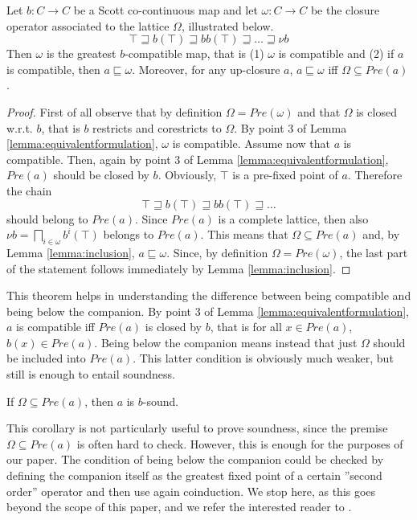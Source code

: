 \documentclass{llncs}
\begin{document}
\begin{theorem}
Let $b\colon C \to C$ be a Scott co-continuous map and let $\omega\colon C \to C$ be the closure operator associated to the lattice $\Omega$, illustrated below.
$$\top \sqsupseteq b(\top)\sqsupseteq bb(\top) \sqsupseteq \dots \sqsupseteq \nu b$$
Then $\omega$ is the greatest $b$-compatible map, that is (1) $\omega$ is compatible and (2) if $a$ is compatible, then $a\sqsubseteq \omega$.
Moreover, for any up-closure $a$, $a\sqsubseteq \omega$ iff $\Omega \subseteq Pre(a)$.
 \end{theorem}
\begin{proof}
First of all observe that by definition $\Omega= Pre(\omega)$ and that $\Omega$ is closed w.r.t. $b$, that is $b$ restricts and corestricts to $\Omega$. By point 3 of Lemma \ref{lemma:equivalentformulation}, $\omega$ is compatible.
Assume now that $a$ is compatible. Then, again by point 3 of Lemma \ref{lemma:equivalentformulation}, $Pre(a)$ should be closed by $b$. Obviously, $\top$ is a pre-fixed point of $a$. Therefore the chain $$\top \sqsupseteq b(\top)\sqsupseteq bb(\top) \sqsupseteq \dots $$ should belong to $Pre(a)$. Since $Pre(a)$ is a complete lattice, then also $\nu b =\bigsqcap_{i\in \omega} b^i(\top)$ belongs to $Pre(a)$. This means that $\Omega \subseteq Pre(a)$ and, by Lemma \ref{lemma:inclusion}, $a\sqsubseteq \omega$. Since, by definition $\Omega=Pre(\omega)$, the last part of the statement follows immediately by Lemma \ref{lemma:inclusion}.
\end{proof}
This theorem helps in understanding the difference between being compatible and being below the companion. By point 3 of Lemma \ref{lemma:equivalentformulation},  $a$ is compatible iff $Pre(a)$ is closed by $b$, that is for all $x\in Pre(a)$, $b(x)\in Pre(a)$. Being below the companion means instead that just $\Omega$ should be included into $Pre(a)$. This latter condition is obviously much weaker, but still is enough to entail soundness.
%
\begin{corollary}\label{cor:silly}
If $\Omega \subseteq Pre(a)$, then $a$ is $b$-sound.
\end{corollary}
This corollary is not particularly useful to prove soundness, since the premise $\Omega \subseteq Pre(a)$ is often hard to check. However, this is enough for the purposes of our paper. The condition of being below the companion could be checked by defining the companion itself as the greatest fixed point of a certain ''second order'' operator and then use again coinduction. We stop here, as this goes beyond the scope of this paper, and we refer the interested reader to \cite{}.
\end{document}
